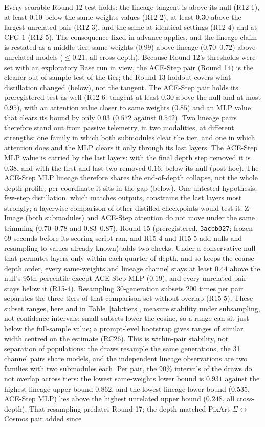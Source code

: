 \documentclass[11pt]{article}
\begin{document}
Every scorable Round 12 test holds: the lineage tangent is above its null (R12-1), at least $0.10$ below the same-weights values (R12-2), at least $0.30$ above the largest unrelated pair (R12-3), and the same at identical settings (R12-4) and at CFG 1 (R12-5). The consequence fixed in advance applies, and the lineage claim is restated as a middle tier: same weights ($0.99$) above lineage ($0.70$--$0.72$) above unrelated models ($\le0.21$, all cross-depth). Because Round 12's thresholds were set with an exploratory Base run in view, the ACE-Step pair (Round 14) is the cleaner out-of-sample test of the tier; the Round 13 holdout covers what distillation changed (below), not the tangent. The ACE-Step pair holds its preregistered test as well (R12-6: tangent at least $0.30$ above the null and at most $0.95$), with an attention value closer to same weights ($0.85$) and an MLP value that clears its bound by only $0.03$ ($0.572$ against $0.542$). Two lineage pairs therefore stand out from passive telemetry, in two modalities, at different strengths: one family in which both submodules clear the tier, and one in which attention does and the MLP clears it only through its last layers. The ACE-Step MLP value is carried by the last layers: with the final depth step removed it is $0.38$, and with the first and last two removed $0.16$, below its null (post hoc). The ACE-Step MLP lineage therefore shares the end-of-depth collapse, not the whole depth profile; per coordinate it sits in the gap (below). One untested hypothesis: few-step distillation, which matches outputs, constrains the last layers most strongly; a layerwise comparison of other distilled checkpoints would test it; Z-Image (both submodules) and ACE-Step attention do not move under the same trimming ($0.70$--$0.78$ and $0.83$--$0.87$). Round 15 (preregistered, \texttt{3acbb027}; frozen 69 seconds before its scoring script ran, and R15-4 and R15-5 add nulls and resampling to values already known) adds two checks. Under a conservative null that permutes layers only within each quarter of depth, and so keeps the coarse depth order, every same-weights and lineage channel stays at least $0.44$ above the null's 95th percentile except ACE-Step MLP ($0.19$), and every unrelated pair stays below it (R15-4). Resampling 30-generation subsets 200 times per pair separates the three tiers of that comparison set without overlap (R15-5). These subset ranges, here and in Table~\ref{tab:tiers}, measure stability under subsampling, not confidence intervals: small subsets lower the cosine, so a range can sit just below the full-sample value; a prompt-level bootstrap gives ranges of similar width centred on the estimate (RC26). This is within-pair stability, not separation of populations: the draws resample the same generations, the 31 channel pairs share models, and the independent lineage observations are two families with two submodules each. Per pair, the 90\% intervals of the draws do not overlap across tiers: the lowest same-weights lower bound is $0.931$ against the highest lineage upper bound $0.862$, and the lowest lineage lower bound ($0.535$, ACE-Step MLP) lies above the highest unrelated upper bound ($0.248$, all cross-depth). That resampling predates Round 17; the depth-matched PixArt-$\Sigma$$\leftrightarrow$Cosmos pair added since 
\end{document}
